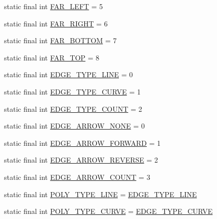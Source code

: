 \begin{DoxyCompactItemize}
\item 
static final int \hyperlink{interfaceprefuse_1_1_constants_a0ef7bd3d9cbbb330e6d260d1b77729c8}{\-F\-A\-R\-\_\-\-L\-E\-F\-T} = 5
\item 
static final int \hyperlink{interfaceprefuse_1_1_constants_a1bba50f8d89facf24195425b9a1ea979}{\-F\-A\-R\-\_\-\-R\-I\-G\-H\-T} = 6
\item 
static final int \hyperlink{interfaceprefuse_1_1_constants_ac8acbb8fec75f749bb49ac814d71d601}{\-F\-A\-R\-\_\-\-B\-O\-T\-T\-O\-M} = 7
\item 
static final int \hyperlink{interfaceprefuse_1_1_constants_aaae3029a22766fb71e51db72448ed0c4}{\-F\-A\-R\-\_\-\-T\-O\-P} = 8
\item 
static final int \hyperlink{interfaceprefuse_1_1_constants_a0b841334ca84a77ab2a3e3f9cf2aa90f}{\-E\-D\-G\-E\-\_\-\-T\-Y\-P\-E\-\_\-\-L\-I\-N\-E} = 0
\item 
static final int \hyperlink{interfaceprefuse_1_1_constants_a41f19777f0b7d810d2c7e840a63ed861}{\-E\-D\-G\-E\-\_\-\-T\-Y\-P\-E\-\_\-\-C\-U\-R\-V\-E} = 1
\item 
static final int \hyperlink{interfaceprefuse_1_1_constants_a0f3b3a3de8ec584e896d80a22e192696}{\-E\-D\-G\-E\-\_\-\-T\-Y\-P\-E\-\_\-\-C\-O\-U\-N\-T} = 2
\item 
static final int \hyperlink{interfaceprefuse_1_1_constants_af4429ca57fecba42267f8e8c0047d5da}{\-E\-D\-G\-E\-\_\-\-A\-R\-R\-O\-W\-\_\-\-N\-O\-N\-E} = 0
\item 
static final int \hyperlink{interfaceprefuse_1_1_constants_ab648752c563c98d5c620988d24d9f7b4}{\-E\-D\-G\-E\-\_\-\-A\-R\-R\-O\-W\-\_\-\-F\-O\-R\-W\-A\-R\-D} = 1
\item 
static final int \hyperlink{interfaceprefuse_1_1_constants_adf52f4b892adf2f1281409582f3ceb53}{\-E\-D\-G\-E\-\_\-\-A\-R\-R\-O\-W\-\_\-\-R\-E\-V\-E\-R\-S\-E} = 2
\item 
static final int \hyperlink{interfaceprefuse_1_1_constants_abdc8050e3c89e1b0f4c8d9861a64ed06}{\-E\-D\-G\-E\-\_\-\-A\-R\-R\-O\-W\-\_\-\-C\-O\-U\-N\-T} = 3
\item 
static final int \hyperlink{interfaceprefuse_1_1_constants_a3f9e025aca38973989eea323264cd5e1}{\-P\-O\-L\-Y\-\_\-\-T\-Y\-P\-E\-\_\-\-L\-I\-N\-E} = \hyperlink{interfaceprefuse_1_1_constants_a0b841334ca84a77ab2a3e3f9cf2aa90f}{\-E\-D\-G\-E\-\_\-\-T\-Y\-P\-E\-\_\-\-L\-I\-N\-E}
\item 
static final int \hyperlink{interfaceprefuse_1_1_constants_a62fa626bdf70a3f506677f32cf16d827}{\-P\-O\-L\-Y\-\_\-\-T\-Y\-P\-E\-\_\-\-C\-U\-R\-V\-E} = \hyperlink{interfaceprefuse_1_1_constants_a41f19777f0b7d810d2c7e840a63ed861}{\-E\-D\-G\-E\-\_\-\-T\-Y\-P\-E\-\_\-\-C\-U\-R\-V\-E}

\end{DoxyCompactItemize}
